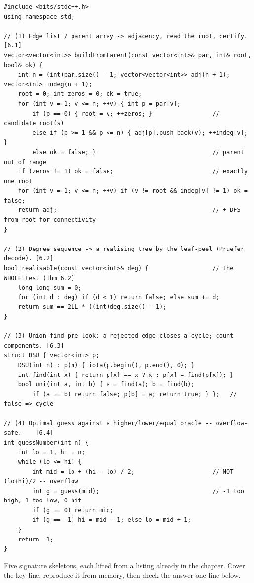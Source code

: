 \begin{lstlisting}[caption={Chapter 6 code kit: rebuild, realise, union-find, guess}, label={lst:c25-kit}]
#include <bits/stdc++.h>
using namespace std;

// (1) Edge list / parent array -> adjacency, read the root, certify.   [6.1]
vector<vector<int>> buildFromParent(const vector<int>& par, int& root, bool& ok) {
    int n = (int)par.size() - 1; vector<vector<int>> adj(n + 1); vector<int> indeg(n + 1);
    root = 0; int zeros = 0; ok = true;
    for (int v = 1; v <= n; ++v) { int p = par[v];
        if (p == 0) { root = v; ++zeros; }                 // candidate root(s)
        else if (p >= 1 && p <= n) { adj[p].push_back(v); ++indeg[v]; }
        else ok = false; }                                 // parent out of range
    if (zeros != 1) ok = false;                            // exactly one root
    for (int v = 1; v <= n; ++v) if (v != root && indeg[v] != 1) ok = false;
    return adj;                                            // + DFS from root for connectivity
}

// (2) Degree sequence -> a realising tree by the leaf-peel (Pruefer decode). [6.2]
bool realisable(const vector<int>& deg) {                  // the WHOLE test (Thm 6.2)
    long long sum = 0;
    for (int d : deg) if (d < 1) return false; else sum += d;
    return sum == 2LL * ((int)deg.size() - 1);
}

// (3) Union-find pre-look: a rejected edge closes a cycle; count components. [6.3]
struct DSU { vector<int> p;
    DSU(int n) : p(n) { iota(p.begin(), p.end(), 0); }
    int find(int x) { return p[x] == x ? x : p[x] = find(p[x]); }
    bool uni(int a, int b) { a = find(a); b = find(b);
        if (a == b) return false; p[b] = a; return true; } };   // false => cycle

// (4) Optimal guess against a higher/lower/equal oracle -- overflow-safe.    [6.4]
int guessNumber(int n) {
    int lo = 1, hi = n;
    while (lo <= hi) {
        int mid = lo + (hi - lo) / 2;                      // NOT (lo+hi)/2 -- overflow
        int g = guess(mid);                                // -1 too high, 1 too low, 0 hit
        if (g == 0) return mid;
        if (g == -1) hi = mid - 1; else lo = mid + 1;
    }
    return -1;
}
\end{lstlisting}


Five signature skeletons, each lifted from a listing already in the chapter. Cover the key
line, reproduce it from memory, then check the answer one line below.

